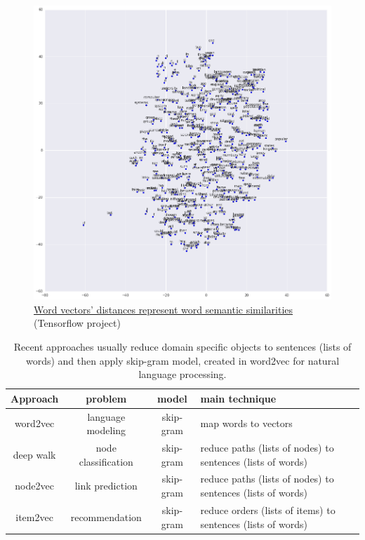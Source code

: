 \documentclass{article}
\begin{document}
\begin{figure}[H]
	\centering
	\includegraphics[width=\linewidth]{tsne}
	\caption{
		\href{https://www.tensorflow.org/tutorials/word2vec/}
		{Word vectors' distances represent word semantic similarities} (Tensorflow project)
	}
	\label{fig:tsne}
\end{figure}
\begin{table}[H]\centering
	\caption{
		Recent approaches usually reduce domain specific objects to sentences (lists of words) and then apply skip-gram model, created in word2vec for natural language processing.
	}
	\begin{tabularx}{\textwidth}{|c|c|c|X|}  \hline \rowcolor{blue!40}
		Approach & problem & model & main technique \\ \hline
		word2vec & language modeling & skip-gram & map words to vectors \\ \hline
		deep walk & node classification & skip-gram & reduce paths (lists of nodes) to sentences (lists of words) \\ \hline
		node2vec & link prediction & skip-gram & reduce paths (lists of nodes) to sentences (lists of words) \\ \hline
		item2vec & recommendation & skip-gram & reduce orders (lists of items) to sentences (lists of words) \\ \hline
	\end{tabularx}
	\label{tab:related-work}
\end{table}
\end{document}
